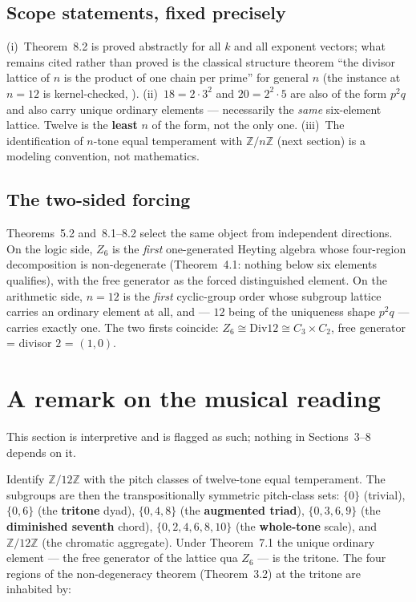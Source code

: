 ﻿\documentclass[11pt]{amsart}
\theoremstyle{plain}
\theoremstyle{definition}
\theoremstyle{remark}
\newcommand{\ZZ}{\mathbb{Z}}
\newcommand{\Znn}[1]{Z_{#1}}
\begin{document}
\subsection*{Scope statements, fixed precisely}
(i)~Theorem~8.2 is proved abstractly for all $k$ and all exponent vectors;
what remains cited rather than proved is the classical structure theorem
``the divisor lattice of $n$ is the product of one chain per prime'' for
general $n$ (the instance at $n = 12$ is kernel-checked,
). (ii)~$18 = 2 \cdot 3^2$ and $20 = 2^2 \cdot 5$
are also of the form $p^2 q$ and also carry unique ordinary elements ---
necessarily the \emph{same} six-element lattice. Twelve is the
\textbf{least} $n$ of the form, not the only one. (iii)~The identification
of $n$-tone equal temperament with $\ZZ/n\ZZ$ (next section) is a modeling
convention, not mathematics.

\subsection*{The two-sided forcing}
Theorems~5.2 and~8.1--8.2 select the same object from independent directions. On
the logic side, $\Znn{6}$ is the \emph{first} one-generated Heyting algebra
whose four-region decomposition is non-degenerate (Theorem~4.1: nothing below
six elements qualifies), with the free generator as the forced distinguished
element. On the arithmetic side, $n = 12$ is the \emph{first} cyclic-group
order whose subgroup lattice carries an ordinary element at all, and --- $12$
being of the uniqueness shape $p^2 q$ --- carries exactly one. The two firsts
coincide: $\Znn{6} \cong \mathrm{Div}12 \cong C_3 \times C_2$, free generator
= divisor $2$ = $(1, 0)$.

\section{A remark on the musical reading}

This section is interpretive and is flagged as such; nothing in
Sections~3--8 depends on it.

Identify $\ZZ/12\ZZ$ with the pitch classes of twelve-tone equal temperament.
The subgroups are then the transpositionally symmetric pitch-class sets:
$\{0\}$ (trivial), $\{0, 6\}$ (the \textbf{tritone} dyad), $\{0, 4, 8\}$ (the
\textbf{augmented triad}), $\{0, 3, 6, 9\}$ (the \textbf{diminished seventh}
chord), $\{0, 2, 4, 6, 8, 10\}$ (the \textbf{whole-tone} scale), and
$\ZZ/12\ZZ$ (the chromatic aggregate). Under Theorem~7.1 the unique ordinary
element --- the free generator of the lattice qua $\Znn{6}$ --- is the
tritone. The four regions of the non-degeneracy theorem (Theorem~3.2) at the
tritone are inhabited by:
\end{document}
